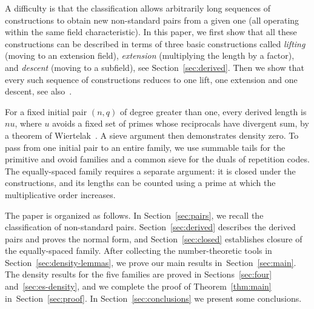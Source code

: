\documentclass[11pt]{article}
\newcommand{\Sec}[1]{Section~\protect\ref{#1}}
\begin{document}
A difficulty is that the classification allows arbitrarily
long sequences of constructions to obtain new non-standard pairs from a given one (all operating within the same field characteristic). In this paper, we first show that all these constructions can be described in terms of three basic constructions called {\em lifting\/} (moving to an extension field), {\em extension\/} (multiplying the length by a factor), and {\em descent\/} (moving to a subfield), see Section~\ref{sec:derived}. Then we show that every such sequence of constructions reduces to one lift, one extension and one descent, see also~\cite{HollmannII}. 

For a fixed initial pair $(n,q)$ of degree greater than one,
every derived length is $nu$, where $u$ avoids a fixed set
of primes whose reciprocals have divergent sum, by a theorem
of Wiertelak~\cite{Wiertelak,Moree}.
A sieve argument then demonstrates density zero. To pass from one initial pair to an entire family, we use summable tails for the primitive and ovoid families and a common sieve for the duals of repetition codes.
The equally-spaced family requires a separate argument: it is closed
under the constructions, and its lengths can be counted using a
prime at which the multiplicative order increases.

The paper is organized as follows. 
In Section~\ref{sec:pairs}, we recall the classification of
non-standard pairs. Section~\ref{sec:derived} describes the
derived pairs and proves the normal form, and
Section~\ref{sec:closed} establishes closure of the equally-spaced
family. After collecting the number-theoretic tools in
Section~\ref{sec:density-lemmas}, we prove our main results in~\Sec{sec:main}. The density results
for the five families are proved in Sections~\ref{sec:four}
and~\ref{sec:es-density}, and we complete the proof of Theorem~\ref{thm:main} in~Section~\ref{sec:proof}. In Section~\ref{sec:conclusions} we present some conclusions.
\end{document}
